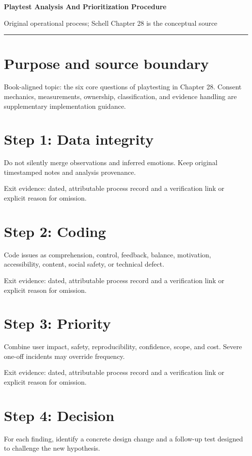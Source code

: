 \documentclass[11pt]{article}
\begin{document}
{\huge\bfseries\color{suiteblue} Playtest Analysis And Prioritization Procedure}\par
\vspace{0.15in}
{\normalsize\color{suitegray} Original operational process; Schell Chapter 28 is the conceptual source}\par
\vspace{0.15in}\hrule\vspace{0.15in}

\section{Purpose and source boundary}
Book-aligned topic: the six core questions of playtesting in Chapter 28. Consent mechanics, measurements, ownership, classification, and evidence handling are supplementary implementation guidance.


\section{Step 1: Data integrity}
Do not silently merge observations and inferred emotions. Keep original timestamped notes and analysis provenance.

Exit evidence: dated, attributable process record and a verification link or explicit reason for omission.


\section{Step 2: Coding}
Code issues as comprehension, control, feedback, balance, motivation, accessibility, content, social safety, or technical defect.

Exit evidence: dated, attributable process record and a verification link or explicit reason for omission.


\section{Step 3: Priority}
Combine user impact, safety, reproducibility, confidence, scope, and cost. Severe one-off incidents may override frequency.

Exit evidence: dated, attributable process record and a verification link or explicit reason for omission.


\section{Step 4: Decision}
For each finding, identify a concrete design change and a follow-up test designed to challenge the new hypothesis.
\end{document}
